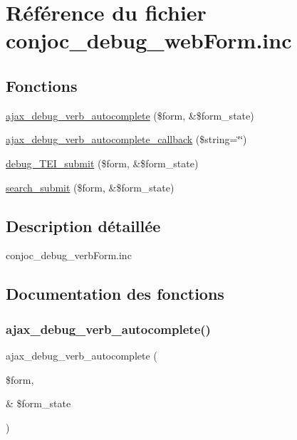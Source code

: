 \hypertarget{conjoc__debug__web_form_8inc}{}\section{Référence du fichier conjoc\+\_\+debug\+\_\+web\+Form.\+inc}
\label{conjoc__debug__web_form_8inc}
\subsection*{Fonctions}
\begin{DoxyCompactItemize}
\item 
\hyperlink{conjoc__debug__web_form_8inc_aafe244ee66a2c6e333d48efccec9164f}{ajax\+\_\+debug\+\_\+verb\+\_\+autocomplete} (\$form, \&\$form\+\_\+state)
\item 
\hyperlink{conjoc__debug__web_form_8inc_aedd67c4b770b58826708010ce4ef7ac7}{ajax\+\_\+debug\+\_\+verb\+\_\+autocomplete\+\_\+callback} (\$string=\char`\"{}\char`\"{})
\item 
\hyperlink{conjoc__debug__web_form_8inc_af6a94ce95f29fca17e5a3fb82855e835}{debug\+\_\+\+T\+E\+I\+\_\+submit} (\$form, \&\$form\+\_\+state)
\item 
\hyperlink{conjoc__debug__web_form_8inc_a11d1063e5c7b2bf2e290639c78266d71}{search\+\_\+submit} (\$form, \&\$form\+\_\+state)
\end{DoxyCompactItemize}


\subsection{Description détaillée}
conjoc\+\_\+debug\+\_\+verb\+Form.\+inc 

\subsection{Documentation des fonctions}
\hypertarget{conjoc__debug__web_form_8inc_aafe244ee66a2c6e333d48efccec9164f}{}\label{conjoc__debug__web_form_8inc_aafe244ee66a2c6e333d48efccec9164f} 
\subsubsection{\texorpdfstring{ajax\+\_\+debug\+\_\+verb\+\_\+autocomplete()}{ajax\_debug\_verb\_autocomplete()}}
{\footnotesize\ttfamily ajax\+\_\+debug\+\_\+verb\+\_\+autocomplete (\begin{DoxyParamCaption}\item[{}]{\$form,  }\item[{\&}]{\$form\+\_\+state }\end{DoxyParamCaption})}

